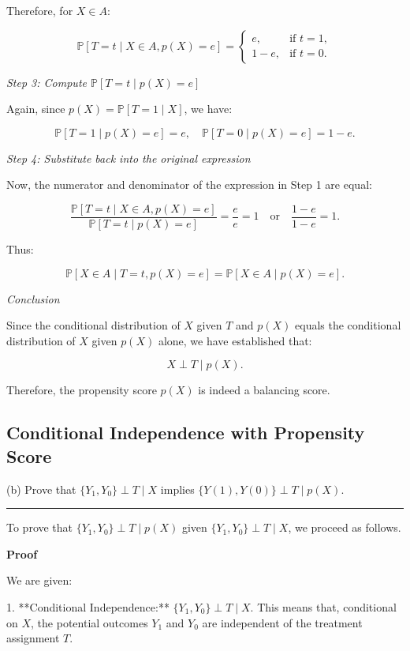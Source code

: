 \documentclass{article}
\newenvironment{colorparagraph}[1]{\par\color{#1}}{\par}
\begin{document}
Therefore, for \( X \in A \):

\[
\mathbb{P}[T = t \mid X \in A, p(X) = e] = 
\begin{cases}
e, & \text{if } t = 1, \\
1 - e, & \text{if } t = 0.
\end{cases}
\]

\textit{Step 3: Compute \(\mathbb{P}[T = t \mid p(X) = e]\)}

Again, since \( p(X) = \mathbb{P}[T = 1 \mid X] \), we have:

\[
\mathbb{P}[T = 1 \mid p(X) = e] = e, \quad \mathbb{P}[T = 0 \mid p(X) = e] = 1 - e.
\]

\textit{Step 4: Substitute back into the original expression}

Now, the numerator and denominator of the expression in Step 1 are equal:

\[
\frac{\mathbb{P}[T = t \mid X \in A, p(X) = e]}{\mathbb{P}[T = t \mid p(X) = e]} = \frac{e}{e} = 1 \quad \text{or} \quad \frac{1 - e}{1 - e} = 1.
\]

Thus:

\[
\mathbb{P}[X \in A \mid T = t, p(X) = e] = \mathbb{P}[X \in A \mid p(X) = e].
\]

\textit{Conclusion}

Since the conditional distribution of \( X \) given \( T \) and \( p(X) \) equals the conditional distribution of \( X \) given \( p(X) \) alone, we have established that:

\[
X \perp T \mid p(X).
\]

Therefore, the propensity score \( p(X) \) is indeed a balancing score.

\begin{colorparagraph}{questioncolor}
\label{q2b}\subsection{Conditional Independence with Propensity Score}
(b) Prove that \( \{Y_1, Y_0\} \perp T \mid X \) implies \( \{Y(1), Y(0)\} \perp T \mid p(X) \).

\rule{\textwidth}{0.5pt}
\end{colorparagraph}

To prove that \( \{Y_1, Y_0\} \perp T \mid p(X) \) given \( \{Y_1, Y_0\} \perp T \mid X \), we proceed as follows.

\textbf{Proof}

We are given:

1. **Conditional Independence:** \( \{Y_1, Y_0\} \perp T \mid X \). This means that, conditional on \( X \), the potential outcomes \( Y_1 \) and \( Y_0 \) are independent of the treatment assignment \( T \).
\end{document}
